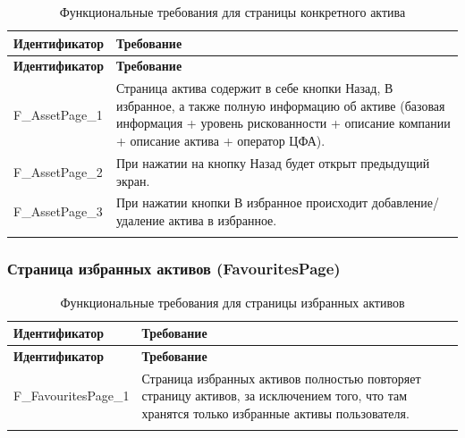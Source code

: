 \documentclass[a4paper, 14pt]{article}
\begin{document}
\begin{longtable}{| p{} | p{} |}
    \hline
    \textbf{Идентификатор}          & \textbf{Требование}                                                                                                                                                                \\
    \hline
    \endfirsthead
    \hline
    \textbf{Идентификатор}          & \textbf{Требование}                                                                                                                                                                \\
    \hline
    \endhead

    F\_AssetPage\_1                 & Страница актива содержит в себе кнопки Назад, В избранное, а также полную информацию об активе (базовая информация + уровень рискованности + описание компании + описание актива + оператор ЦФА).                         \\ \hline
    F\_AssetPage\_2                 & При нажатии на кнопку Назад будет открыт предыдущий экран.                                                                                                                         \\ \hline
    F\_AssetPage\_3                 & При нажатии кнопки В избранное происходит добавление/удаление актива в избранное.                                                                                                  \\ \hline

    \caption{Функциональные требования для страницы конкретного актива}
\end{longtable}

\subsubsection{Страница избранных активов (FavouritesPage)}

\begin{longtable}{| p{} | p{} |}
    \hline
    \textbf{Идентификатор}          & \textbf{Требование}                                                                                                                                                                \\
    \hline
    \endfirsthead
    \hline
    \textbf{Идентификатор}          & \textbf{Требование}                                                                                                                                                                \\
    \hline
    \endhead

    F\_FavouritesPage\_1            & Страница избранных активов полностью повторяет страницу активов, за исключением того, что там хранятся только избранные активы пользователя.                                       \\ \hline

    \caption{Функциональные требования для страницы избранных активов}
\end{longtable}
\end{document}
